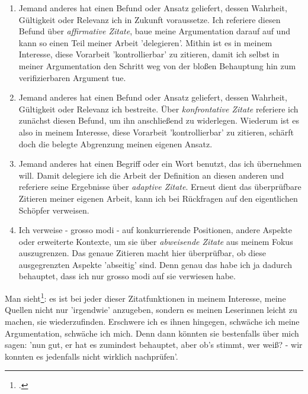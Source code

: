 \begin{enumerate}
  \item Jemand anderes hat einen Befund oder Ansatz geliefert, dessen Wahrheit, Gültigkeit oder Relevanz ich in Zukunft voraussetze. Ich referiere diesen Befund über \emph{affirmative Zitate}, baue meine Argumentation darauf auf und kann so einen Teil meiner Arbeit 'delegieren'. Mithin ist es in meinem Interesse, diese Vorarbeit 'kontrollierbar' zu zitieren, damit ich selbst in meiner Argumentation den Schritt weg von der bloßen Behauptung hin zum verifizierbaren Argument tue.
  \item Jemand anderes hat einen Befund oder Ansatz geliefert, dessen Wahrheit, Gültigkeit oder Relevanz ich bestreite. Über \emph{konfrontative Zitate} referiere ich zunächst diesen Befund, um ihn anschließend zu widerlegen. Wiederum ist es also in meinem Interesse, diese Vorarbeit 'kontrollierbar' zu zitieren, schärft doch die belegte Abgrenzung meinen eigenen Ansatz.
  \item Jemand anderes hat einen Begriff oder ein Wort benutzt, das ich
  übernehmen will. Damit delegiere ich die Arbeit der Definition an diesen
  anderen und referiere seine Ergebnisse über \emph{adaptive Zitate}. Erneut dient das überprüfbare Zitieren meiner eigenen Arbeit, kann ich bei Rückfragen auf den eigentlichen Schöpfer verweisen.
  \item Ich verweise - grosso modi - auf konkurrierende Positionen, andere
  Aspekte oder erweiterte Kontexte, um sie über
  \emph{abweisende Zitate} aus meinem Fokus auszugrenzen. Das genaue Zitieren macht hier überprüfbar, ob diese ausgegrenzten Aspekte 'abseitig' sind. Denn genau das habe ich ja dadurch behauptet, dass ich nur grosso modi auf sie verwiesen habe.
\end{enumerate}

Man sieht\footcite[vgl. dazu auch][hier werden im Abschnitt
'Wissenschaft' drei Funktionen aufgelistet. Das, was ich als 'affirmatives
Zitat' bezeichne, läuft - unter dem Schlagwort 'auf den Schultern von Riesen' -
als Redundanzreduktion, gepaart mit der Überprüfbarkeit. Außerden wird die Moral
ins Feld geführt]{Wikipedia2011a}: es ist bei jeder dieser Zitatfunktionen in
meinem Interesse, meine Quellen nicht nur 'irgendwie' anzugeben,
sondern es meinen Leserinnen leicht zu machen, sie wiederzufinden. Erschwere ich
es ihnen hingegen, schwäche ich meine Argumentation, schwäche ich mich. Denn
dann könnten sie bestenfalls über mich sagen: 'nun gut, er hat es zumindest
behauptet, aber ob's stimmt, wer weiß? - wir konnten es jedenfalls nicht
wirklich nachprüfen'.

